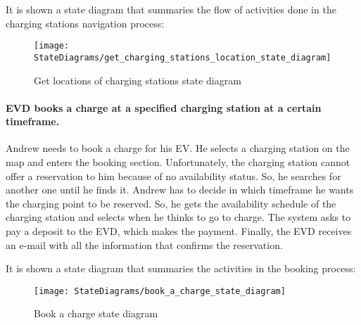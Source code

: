 It is shown a state diagram that summaries the flow of activities done in the charging stations navigation process:
\begin{figure}[H]
    \begin{center}
        \texttt{[image: StateDiagrams/get\_charging\_stations\_location\_state\_diagram]}
        \caption{Get locations of charging stations state diagram}
        \label{fig:locations_sd}%
    \end{center}
\end{figure}

\paragraph{EVD books a charge at a specified charging station at a certain timeframe.}
Andrew needs to book a charge for his EV\@.
He selects a charging station on the map and enters the booking section.
Unfortunately, the charging station cannot offer a reservation to him because of no availability status.
So, he searches for another one until he finds it.
Andrew has to decide in which timeframe he wants the charging point to be reserved.
So, he gets the availability schedule of the charging station and selects when he thinks to go to charge.
The system asks to pay a deposit to the EVD, which makes the payment.
Finally, the EVD receives an e-mail with all the information that confirms the reservation.

It is shown a state diagram that summaries the activities in the booking process:
\begin{figure}[H]
    \begin{center}
        \texttt{[image: StateDiagrams/book\_a\_charge\_state\_diagram]}
        \caption{Book a charge state diagram}
        \label{fig:booking_sd}%
    \end{center}
\end{figure}

